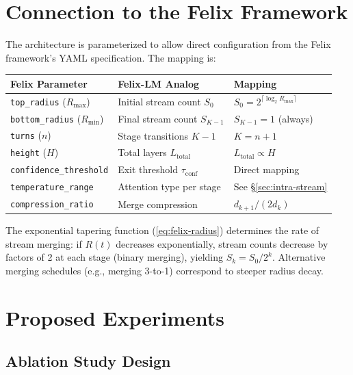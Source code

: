 \documentclass[11pt,a4paper]{article}
\theoremstyle{definition}
\theoremstyle{plain}
\theoremstyle{remark}
\begin{document}
\section{Connection to the Felix Framework}\label{sec:felix-mapping}

The architecture is parameterized to allow direct configuration from the 
Felix framework's YAML specification. The mapping is:

\begin{center}
\renewcommand{\arraystretch}{1.3}
\begin{tabular}{@{}lll@{}}
\toprule
\textbf{Felix Parameter} & \textbf{Felix-LM Analog} & \textbf{Mapping} \\
\midrule
\texttt{top\_radius} ($R_{\max}$) & Initial stream count $S_0$ & 
  $S_0 = 2^{\lceil \log_2 R_{\max} \rceil}$ \\
\texttt{bottom\_radius} ($R_{\min}$) & Final stream count $S_{K-1}$ & 
  $S_{K-1} = 1$ (always) \\
\texttt{turns} ($n$) & Stage transitions $K - 1$ & 
  $K = n + 1$ \\
\texttt{height} ($H$) & Total layers $L_{\text{total}}$ & 
  $L_{\text{total}} \propto H$ \\
\texttt{confidence\_threshold} & Exit threshold $\tau_{\text{conf}}$ & 
  Direct mapping \\
\texttt{temperature\_range} & Attention type per stage & 
  See \S\ref{sec:intra-stream} \\
\texttt{compression\_ratio} & Merge compression & 
  $d_{k+1} / (2 d_k)$ \\
\bottomrule
\end{tabular}
\end{center}

The exponential tapering function (\cref{eq:felix-radius}) determines the 
rate of stream merging: if $R(t)$ decreases exponentially, stream counts 
decrease by factors of 2 at each stage (binary merging), yielding $S_k = 
S_0 / 2^k$. Alternative merging schedules (e.g., merging 3-to-1) 
correspond to steeper radius decay.

\section{Proposed Experiments}\label{sec:experiments}

\subsection{Ablation Study Design}
\end{document}
